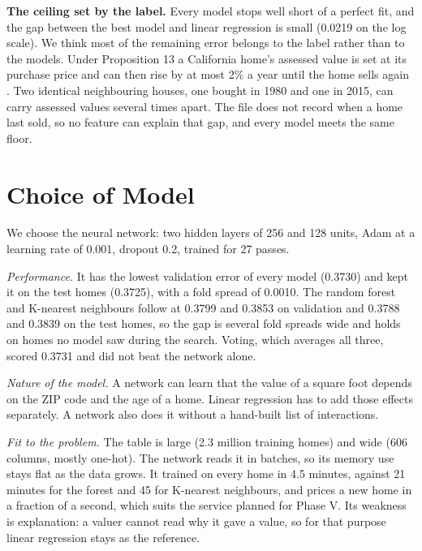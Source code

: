 \documentclass[sigconf,nonacm,10pt]{acmart}
\begin{document}
\textbf{The ceiling set by the label.} Every model stops well short of a perfect fit, and the gap between the best model and linear regression is small (0.0219 on the log scale). We think most of the remaining error belongs to the label rather than to the models. Under Proposition 13 a California home's assessed value is set at its purchase price and can then rise by at most 2\% a year until the home sells again \cite{prop13}. Two identical neighbouring houses, one bought in 1980 and one in 2015, can carry assessed values several times apart. The file does not record when a home last sold, so no feature can explain that gap, and every model meets the same floor.

\section{Choice of Model}
\label{sec:choice}

We choose the neural network: two hidden layers of 256 and 128 units, Adam at a learning rate of 0.001, dropout 0.2, trained for 27 passes.

\emph{Performance.} It has the lowest validation error of every model (0.3730) and kept it on the test homes (0.3725), with a fold spread of 0.0010. The random forest and K-nearest neighbours follow at 0.3799 and 0.3853 on validation and 0.3788 and 0.3839 on the test homes, so the gap is several fold spreads wide and holds on homes no model saw during the search. Voting, which averages all three, scored 0.3731 and did not beat the network alone.

\emph{Nature of the model.} A network can learn that the value of a square foot depends on the ZIP code and the age of a home. Linear regression has to add those effects separately. A network also does it without a hand-built list of interactions.

\emph{Fit to the problem.} The table is large (2.3 million training homes) and wide (606 columns, mostly one-hot). The network reads it in batches, so its memory use stays flat as the data grows. It trained on every home in 4.5 minutes, against 21 minutes for the forest and 45 for K-nearest neighbours, and prices a new home in a fraction of a second, which suits the service planned for Phase V. Its weakness is explanation: a valuer cannot read why it gave a value, so for that purpose linear regression stays as the reference.
\end{document}
